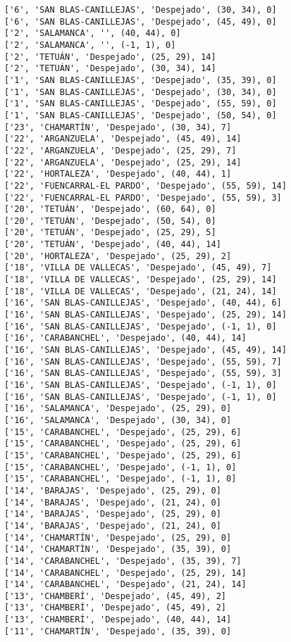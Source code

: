 \documentclass[11pt]{article}
\begin{document}
\begin{Verbatim}[commandchars=\\\{\}]
['6', 'SAN BLAS-CANILLEJAS', 'Despejado', (30, 34), 0]
['6', 'SAN BLAS-CANILLEJAS', 'Despejado', (45, 49), 0]
['2', 'SALAMANCA', '', (40, 44), 0]
['2', 'SALAMANCA', '', (-1, 1), 0]
['2', 'TETUÁN', 'Despejado', (25, 29), 14]
['2', 'TETUÁN', 'Despejado', (30, 34), 14]
['1', 'SAN BLAS-CANILLEJAS', 'Despejado', (35, 39), 0]
['1', 'SAN BLAS-CANILLEJAS', 'Despejado', (30, 34), 0]
['1', 'SAN BLAS-CANILLEJAS', 'Despejado', (55, 59), 0]
['1', 'SAN BLAS-CANILLEJAS', 'Despejado', (50, 54), 0]
['23', 'CHAMARTÍN', 'Despejado', (30, 34), 7]
['22', 'ARGANZUELA', 'Despejado', (45, 49), 14]
['22', 'ARGANZUELA', 'Despejado', (25, 29), 7]
['22', 'ARGANZUELA', 'Despejado', (25, 29), 14]
['22', 'HORTALEZA', 'Despejado', (40, 44), 1]
['22', 'FUENCARRAL-EL PARDO', 'Despejado', (55, 59), 14]
['22', 'FUENCARRAL-EL PARDO', 'Despejado', (55, 59), 3]
['20', 'TETUÁN', 'Despejado', (60, 64), 0]
['20', 'TETUÁN', 'Despejado', (50, 54), 0]
['20', 'TETUÁN', 'Despejado', (25, 29), 5]
['20', 'TETUÁN', 'Despejado', (40, 44), 14]
['20', 'HORTALEZA', 'Despejado', (25, 29), 2]
['18', 'VILLA DE VALLECAS', 'Despejado', (45, 49), 7]
['18', 'VILLA DE VALLECAS', 'Despejado', (25, 29), 14]
['18', 'VILLA DE VALLECAS', 'Despejado', (21, 24), 14]
['16', 'SAN BLAS-CANILLEJAS', 'Despejado', (40, 44), 6]
['16', 'SAN BLAS-CANILLEJAS', 'Despejado', (25, 29), 14]
['16', 'SAN BLAS-CANILLEJAS', 'Despejado', (-1, 1), 0]
['16', 'CARABANCHEL', 'Despejado', (40, 44), 14]
['16', 'SAN BLAS-CANILLEJAS', 'Despejado', (45, 49), 14]
['16', 'SAN BLAS-CANILLEJAS', 'Despejado', (55, 59), 7]
['16', 'SAN BLAS-CANILLEJAS', 'Despejado', (55, 59), 3]
['16', 'SAN BLAS-CANILLEJAS', 'Despejado', (-1, 1), 0]
['16', 'SAN BLAS-CANILLEJAS', 'Despejado', (-1, 1), 0]
['16', 'SALAMANCA', 'Despejado', (25, 29), 0]
['16', 'SALAMANCA', 'Despejado', (30, 34), 0]
['15', 'CARABANCHEL', 'Despejado', (25, 29), 6]
['15', 'CARABANCHEL', 'Despejado', (25, 29), 6]
['15', 'CARABANCHEL', 'Despejado', (25, 29), 6]
['15', 'CARABANCHEL', 'Despejado', (-1, 1), 0]
['15', 'CARABANCHEL', 'Despejado', (-1, 1), 0]
['14', 'BARAJAS', 'Despejado', (25, 29), 0]
['14', 'BARAJAS', 'Despejado', (21, 24), 0]
['14', 'BARAJAS', 'Despejado', (25, 29), 0]
['14', 'BARAJAS', 'Despejado', (21, 24), 0]
['14', 'CHAMARTÍN', 'Despejado', (25, 29), 0]
['14', 'CHAMARTÍN', 'Despejado', (35, 39), 0]
['14', 'CARABANCHEL', 'Despejado', (35, 39), 7]
['14', 'CARABANCHEL', 'Despejado', (25, 29), 14]
['14', 'CARABANCHEL', 'Despejado', (21, 24), 14]
['13', 'CHAMBERÍ', 'Despejado', (45, 49), 2]
['13', 'CHAMBERÍ', 'Despejado', (45, 49), 2]
['13', 'CHAMBERÍ', 'Despejado', (40, 44), 14]
['11', 'CHAMARTÍN', 'Despejado', (35, 39), 0]

\end{Verbatim}
\end{document}
